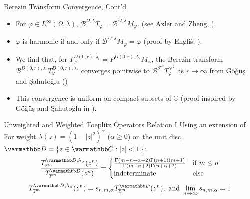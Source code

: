 \documentclass{reu_beamer}
\begin{document}
\begin{frame}{Berezin Transform Convergence, Cont'd}
\begin{itemize}
    \item For $\varphi \in L^{\infty}(\Omega,\lambda)$, $\mathcal{B}^{\Omega,\lambda}T_{\varphi} = \mathcal{B}^{\Omega,\lambda}M_\varphi$. (see Axler and Zheng, \cite{AxlerZhengToeplitzOperators}).
    \item $\varphi$ is harmonic if and only if $\mathcal{B}^{\Omega,\lambda} M_\varphi = \varphi$  (proof by Engli\v s, \cite{EnglisHarmonicFunctions}).
    \item We find that, for $T^{D(0,r), \lambda_r}_{\varphi} = P^{D(0,r), \lambda_r}M_{\varphi}$, the Berezin transform $\mathcal{B}^{D(0,r), \lambda_r}T^{D(0,r), \lambda_r}_\varphi$ converges pointwise to $\mathcal{B}^{\mathcal{F}^2}T^{\mathcal{F}^2}_{\varphi}$ as $r\rightarrow\infty$ from G\"{o}\u{g}\"{u}\c{s} and \c{S}ahuto\u{g}lu (\cite{SahutogluGogus2020})
    \item This convergence is uniform on compact subsets of $\mathbb{C}$ (proof inspired by G\"{o}\u{g}\"{u}\c{s} and \c{S}ahuto\u{g}lu in \cite{SahutogluGogus2020}).
\end{itemize}
\end{frame}
\begin{frame}{Unweighted and Weighted Toeplitz Operators Relation I}
    Using an extension of \cite[Lemma 2.1]{AshleyAdenCelikDanielLuke2024}
    \newline\newline
    For weight $\lambda(z)=\left(1-|z|^2\right)^\alpha$ ($\alpha \geq 0$) on the unit disc, \(\mathbb{D} = \crl{z \in \C: \left |z| < 1\right.}\):
        \[
        \frac{T^{\disc, \lambda_\alpha}_{\overline{z}^m}(z^n)}{T^{\mathbb{D}}_{\overline{z}^m}(z^n)} =
        \begin{cases}
            \frac{\Gamma(m-n+\alpha-2)\Gamma(n+1)(m+1)}{\Gamma(m-n+2)\Gamma(n+\alpha+2)}&\text{if}\ m \leq n \\
            \text{indeterminate} &\text{else}
        \end{cases}
    \] 
    \newline
    \[T^{\disc, \lambda_\alpha}_{\overline{z}^m}(z^n)=s_{n,m,\alpha}T^{\disc}_{\overline{z}^m}(z^n),\text{ and }\limit{n}{\infty}s_{n,m,\alpha}=1\]
\end{frame}
\end{document}
